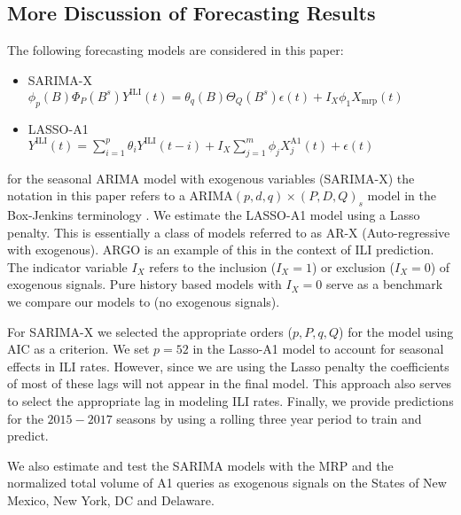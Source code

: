 \documentclass[12pt]{article}
\begin{document}


\subsection{More Discussion of Forecasting Results}

The following forecasting models are considered in this paper:
\begin{itemize}
\item SARIMA-X \\
$\phi_p(B)\Phi_P(B^s)Y^{\text{ILI}}(t) =  \theta_q(B)\Theta_Q(B^s)\epsilon(t) + I_X\phi_1 X_{\text{mrp}}(t)$
\item LASSO-A1 \\
$Y^{\text{ILI}}(t) = \sum_{i=1}^p \theta_i Y^{\text{ILI}}(t-i) +  I_X\sum_{j=1}^m \phi_j X_j^{\text{A1}}(t) + \epsilon(t)$
\end{itemize}

for the seasonal ARIMA model with exogenous variables (SARIMA-X) the notation in this paper refers to a ARIMA$(p,d,q)\times(P,D,Q)_s$ model in the Box-Jenkins terminology \citep{box_etal_2015}. We estimate the LASSO-A1 model using a Lasso penalty. This is essentially a class of models referred to as AR-X (Auto-regressive with exogenous). ARGO \cite{yang_etal_2015inference, yang_etal_2015} is an example of this in the context of ILI prediction. The indicator variable $I_X$ refers to the inclusion ($I_X=1$) or exclusion ($I_X=0$) of exogenous signals. Pure history based models with $I_X=0$ serve as a benchmark we compare our models to (no exogenous signals).

For SARIMA-X we selected the appropriate orders ($p,P,q,Q$) for the model using AIC as a criterion. We set $p=52$ in the Lasso-A1 model to account for seasonal effects in ILI rates. However, since we are using the Lasso penalty the coefficients of most of these lags will not appear in the final model. This approach also serves to select the appropriate lag in modeling ILI rates. Finally, we provide predictions for the $2015-2017$ seasons by using a rolling three year period to train and predict.

We also estimate and test the SARIMA models with the MRP and the normalized total volume of A1 queries as exogenous signals on the States of New Mexico, New York, DC and Delaware.
\end{document}
